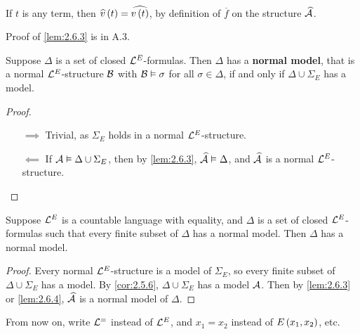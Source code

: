 \begin{note*}
If $ t $ is any term, then $ \widehat{v}\rb{t} = \widehat{v\rb{t}} $, by definition of $ \overline{f} $ on the structure $ \widehat{\AA} $.
\end{note*}

Proof of \ref{lem:2.6.3} is in A.3.

\begin{lemma}
\label{lem:2.6.4}
Suppose $ \Delta $ is a set of closed $ \LL^E $-formulas. Then $ \Delta $ has a \textbf{normal model}, that is a normal $ \LL^E $-structure $ \BB $ with $ \BB \vDash \sigma $ for all $ \sigma \in \Delta $, if and only if $ \Delta \cup \Sigma_E $ has a model.
\end{lemma}

\begin{proof}
\hfill
\begin{itemize}
\item[$ \implies $] Trivial, as $ \Sigma_E $ holds in a normal $ \LL^E $-structure.
\item[$ \impliedby $] If $ \AA \vDash \Delta \cup \Sigma_E $, then by \ref{lem:2.6.3}, $ \widehat{\AA} \vDash \Delta $, and $ \widehat{\AA} $ is a normal $ \LL^E $-structure.
\end{itemize}
\end{proof}

\begin{theorem}
Suppose $ \LL^E $ is a countable language with equality, and $ \Delta $ is a set of closed $ \LL^E $-formulas such that every finite subset of $ \Delta $ has a normal model. Then $ \Delta $ has a normal model.
\end{theorem}

\begin{proof}
Every normal $ \LL^E $-structure is a model of $ \Sigma_E $, so every finite subset of $ \Delta \cup \Sigma_E $ has a model. By \ref{cor:2.5.6}, $ \Delta \cup \Sigma_E $ has a model $ \AA $. Then by \ref{lem:2.6.3} or \ref{lem:2.6.4}, $ \widehat{\AA} $ is a normal model of $ \Delta $.
\end{proof}

\begin{notation*}
From now on, write $ \LL^= $ instead of $ \LL^E $, and $ x_1 = x_2 $ instead of $ E\rb{x_1, x_2} $, etc.
\end{notation*}

\pagebreak


